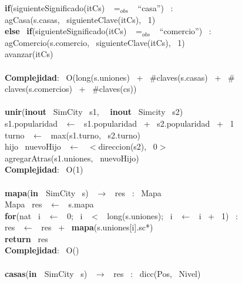 \indent \indent \textbf{if}(siguienteSignificado(itCs) \ $=_{obs}$ \ ``casa'') \ :\\
\indent \indent \indent agCasa(s.casas, \ siguienteClave(itCs), \ 1)\\
\indent \indent \textbf{else} \ \textbf{if}(siguienteSignificado(itCs) \ $=_{obs}$ \ ``comercio'') \ :\\
\indent \indent \indent agComercio(s.comercio, \ siguienteClave(itCs), \ 1)\\
\indent \indent avanzar(itCs)\\
\\
\textbf{Complejidad}: \ O(long(s.uniones) \ + \ $ \# $claves(s.casas) \ + \ $ \# $claves(s.comercios) \ + \ $ \# $claves(cs))\\
\noindent\makebox[\linewidth]{\rule{\textwidth}{0.4pt}}
\\
\noindent\makebox[\linewidth]{\rule{\textwidth}{0.4pt}}
\textbf{unir}(\textbf{inout} \ SimCity \ s1, \  \ \textbf{inout} \ Simcity \ s2)\\
\indent s1.popularidad \ $\leftarrow$ \ s1.popularidad \ + \ s2.popularidad \ + \ 1\\
\indent turno \ $\leftarrow$ \ max(s1.turno, \ s2.turno)\\
\indent hijo \ nuevoHijo \ $\leftarrow$ \ $<$direccion(s2), \ 0$>$\\
\indent agregarAtras(s1.uniones, \ nuevoHijo)\\
\textbf{Complejidad}: \ O(1)\\
\noindent\makebox[\linewidth]{\rule{\textwidth}{0.4pt}}
\\
\noindent\makebox[\linewidth]{\rule{\textwidth}{0.4pt}}
\textbf{mapa}(\textbf{in \ }SimCity \ s) \ $\rightarrow $ \ res \ : \ Mapa \ \\
\indent Mapa \ res \ $\leftarrow$ \ s.mapa\\
\indent \textbf{for}(nat \ i \ $\leftarrow$ \ 0; \ i \ $<$ \ long(s.uniones); \ i \ $\leftarrow$ \ i \ + \ 1) \ : \ \\
\indent \indent res \ $\leftarrow$ \ res \ + \ \textbf{mapa}(s.uniones[i].sc*)\\
\indent \textbf{return} \ res\\
\textbf{Complejidad}: \ O()\\
\noindent\makebox[\linewidth]{\rule{\textwidth}{0.4pt}}
\\
\noindent\makebox[\linewidth]{\rule{\textwidth}{0.4pt}}
\textbf{casas}(\textbf{in \ }SimCity \ s) \ $\rightarrow $ \ res \ : \ dicc(Pos, \ Nivel)\\
